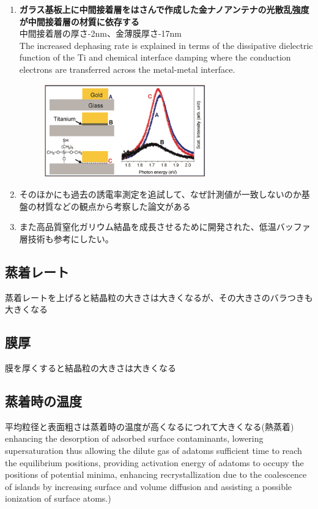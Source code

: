 \documentclass[11pt]{article}
\begin{document}
\begin{enumerate}
\item  {\bf ガラス基板上に中間接着層をはさんで作成した金ナノアンテナの光散乱強度が中間接着層の材質に依存する}\\ 中間接着層の厚さ-2nm、金薄膜厚さ-17nm\\The increased dephasing rate is explained in terms of the dissipative dielectric function of the Ti and chemical interface damping where the conduction electrons are transferred across the metal-metal interface.\cite{Au_on_Ti}\\
\begin{figure}[H]
\centering
  \includegraphics[width=7cm]{./Au_on_Ti}
\end{figure}


\item そのほかにも過去の誘電率測定を追試して、なぜ計測値が一致しないのか基盤の材質などの観点から考察した論文がある\cite{Au_on_Ti_Ali}

\item また高品質窒化ガリウム結晶を成長させるために開発された、低温バッファ層技術も参考にしたい。
\end{enumerate}

\subsection{蒸着レート}
蒸着レートを上げると結晶粒の大きさは大きくなるが、その大きさのバラつきも大きくなる\cite{Deposition_rate}

\subsection{膜厚}
膜を厚くすると結晶粒の大きさは大きくなる\cite{Thickness_dependence}

\subsection{蒸着時の温度}
平均粒径と表面粗さは蒸着時の温度が高くなるにつれて大きくなる(熱蒸着)\\ enhancing the desorption of adsorbed surface contaminants, lowering supersaturation thus allowing the dilute gas of adatoms sufficient time to reach the equilibrium positions, providing activation energy of adatoms to occupy the positions of potential minima, enhancing recrystallization due to the coalescence of islands by increasing surface and volume diffusion and assisting a possible ionization of surface atoms.)  \cite{Au_mica_glass_etc}
\end{document}
